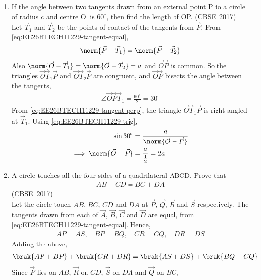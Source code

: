 \begin{enumerate}[label=\thesubsection.\arabic*, ref=\thesubsection.\theenumi]
\item 
If the angle between two tangents drawn from an external point P to a circle of radius $a$ and centre O, is $60^{\circ}$, then find the length of OP.
\hfill (CBSE~2017)
\\
\solution
Let $\vec{T}_1$ and $\vec{T}_2$ be the points of contact of the tangents from $\vec{P}$. From \eqref{eq:EE26BTECH11229-tangent-equal},
\begin{align}
	\norm{\vec{P}-\vec{T}_1} = \norm{\vec{P}-\vec{T}_2}
\end{align}
Also $\norm{\vec{O}-\vec{T}_1} = \norm{\vec{O}-\vec{T}_2} = a$ and $\vec{O}\vec{P}$ is common. So the triangles $\vec{O}\vec{T}_1\vec{P}$ and $\vec{O}\vec{T}_2\vec{P}$ are congruent, and $\vec{O}\vec{P}$ bisects the angle between the tangents,
\begin{align}
	\angle \vec{O}\vec{P}\vec{T}_1 = \frac{60^{\circ}}{2} = 30^{\circ}
\end{align}
From \eqref{eq:EE26BTECH11229-tangent-perp}, the triangle $\vec{O}\vec{T}_1\vec{P}$ is right angled at $\vec{T}_1$. Using \eqref{eq:EE26BTECH11229-trig},
\begin{align}
	\sin 30^{\circ} &= \frac{a}{\norm{\vec{O}-\vec{P}}}
	\\
	\implies \norm{\vec{O}-\vec{P}} &= \frac{a}{\frac{1}{2}} = 2a
\end{align}
\item 
A circle touches all the four sides of a quadrilateral ABCD. Prove that 
\begin{align*}
	AB + CD = BC + DA
\end{align*}
\hfill (CBSE~2017)
\\
\solution
Let the circle touch $AB$, $BC$, $CD$ and $DA$ at $\vec{P}$, $\vec{Q}$, $\vec{R}$ and $\vec{S}$ respectively. The tangents drawn from each of $\vec{A}$, $\vec{B}$, $\vec{C}$ and $\vec{D}$ are equal, from \eqref{eq:EE26BTECH11229-tangent-equal}. Hence,
\begin{align}
	AP = AS, \quad BP = BQ, \quad CR = CQ, \quad DR = DS
	\label{eq:EE26BTECH11229-Prob_5-1}
\end{align}
Adding the above,
\begin{align}
	\brak{AP + BP} + \brak{CR + DR} = \brak{AS + DS} + \brak{BQ + CQ}
\end{align}
Since $\vec{P}$ lies on $AB$, $\vec{R}$ on $CD$, $\vec{S}$ on $DA$ and $\vec{Q}$ on $BC$, 
\begin{align}

\end{align}
\end{enumerate}

